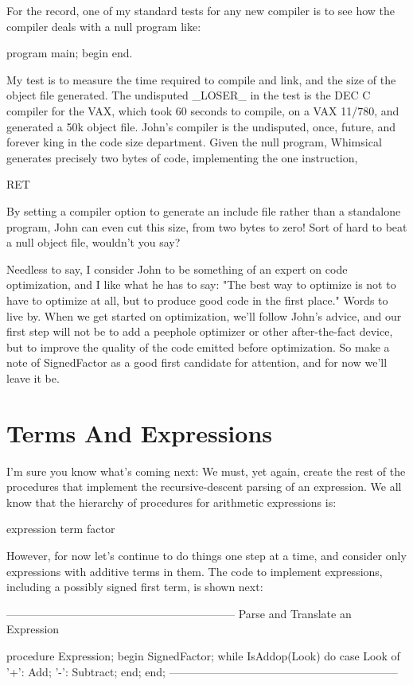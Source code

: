 \documentclass[float=false, crop=false]{standalone}
\begin{document}
For the record, one of my standard tests for any new compiler is to see
how the compiler deals with a null program like:

	program main;
	begin
	end.

My test is to measure the time required to compile and link, and the size of the
object file generated. The undisputed _LOSER_ in the test is the DEC C compiler
for the VAX, which took 60 seconds to compile, on a VAX 11/780, and generated a
50k object file. John's compiler is the undisputed, once, future, and forever
king in the code size department. Given the null program, Whimsical generates
precisely two bytes of code, implementing the one instruction,

	RET

By setting a compiler option to generate an include file rather than a
standalone program, John can even cut this size, from two bytes to zero! Sort of
hard to beat a null object file, wouldn't you say?

Needless to say, I consider John to be something of an expert on code
optimization, and I like what he has to say: "The best way to optimize is not to
have to optimize at all, but to produce good code in the first place." Words to
live by. When we get started on optimization, we'll follow John's advice, and
our first step will not be to add a peephole optimizer or other after-the-fact
device, but to improve the quality of the code emitted before optimization. So
make a note of SignedFactor as a good first candidate for attention, and for now
we'll leave it be.

\section{Terms And Expressions}

I'm sure you know what's coming next: We must, yet again, create the rest of the
procedures that implement the recursive-descent parsing of an expression. We all
know that the hierarchy of procedures for arithmetic expressions is:

expression
	term
		factor

However, for now let's continue to do things one step at a time, and consider
only expressions with additive terms in them. The code to implement expressions,
including a possibly signed first term, is shown next:

\begin{code}
{--------------------------------------------------------------}
{ Parse and Translate an Expression }

procedure Expression;
begin
	SignedFactor;
	while IsAddop(Look) do
		case Look of
			'+': Add;
			'-': Subtract;
		end;
end;
{--------------------------------------------------------------}
\end{code}
\end{document}
